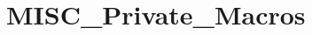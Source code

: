 \hypertarget{group___m_i_s_c___private___macros}{\section{M\-I\-S\-C\-\_\-\-Private\-\_\-\-Macros}
\label{group___m_i_s_c___private___macros}
}
